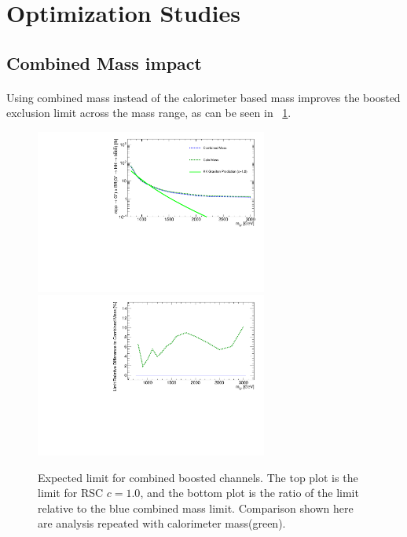 \section{Optimization Studies}

\subsection{Combined Mass impact}
\label{sec:app-optimization-cbmass}
\paragraph{}
Using combined mass instead of the calorimeter based mass improves the boosted exclusion limit across the mass range, as can be seen in ~\ref{fig:app-optimization-mass}.

\begin{figure}[htbp!]
\begin{center}
\includegraphics[angle=270, width=0.68\textwidth]{./figures/boosted/AppendixOptimization/CompareLimits_HH_BoostedNewRun2-mass_c10.pdf}\\
\includegraphics[angle=270, width=0.68\textwidth]{./figures/boosted/AppendixOptimization/CompareLimits_HH_BoostedNewRun2-mass_c10_ratio.pdf}
  \caption{Expected limit for combined boosted channels. The top plot is the limit for RSC $c=1.0$, and the bottom plot is the ratio of the limit relative to the blue combined mass limit. Comparison shown here are analysis repeated with calorimeter mass(green).}
  \label{fig:app-optimization-mass}
\end{center}
\end{figure}


